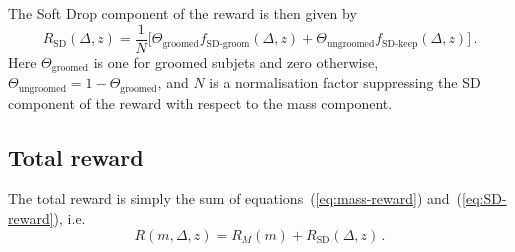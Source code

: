 \documentclass[12pt,twoside]{article}
\begin{document}
The Soft Drop component of the reward is then given by
\begin{equation}
  \label{eq:SD-reward}
  R_\text{SD}(\Delta, z) =
  \frac{1}{N}\big[\Theta_{\text{groomed}} f_\text{SD-groom}(\Delta, z)
  + \Theta_\text{ungroomed} f_\text{SD-keep}(\Delta, z)\big]\,.  
\end{equation}
Here $\Theta_\text{groomed}$ is one for groomed subjets and zero
otherwise, $\Theta_\text{ungroomed} = 1 - \Theta_\text{groomed}$, and
$N$ is a normalisation factor suppressing the SD component of the
reward with respect to the mass component.

\subsection{Total reward}

The total reward is simply the sum of equations~(\ref{eq:mass-reward})
and~(\ref{eq:SD-reward}), i.e.
\begin{equation}
  \label{eq:reward}
  R(m,\Delta,z) = R_M(m) + R_\text{SD}(\Delta, z)\,.
\end{equation}

\end{document}
